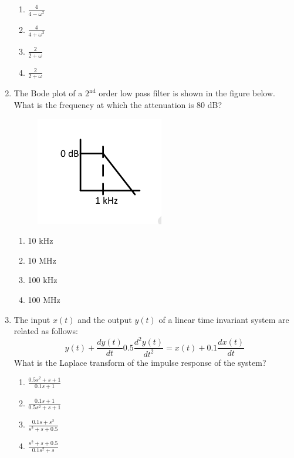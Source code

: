 \documentclass[a4paper,12pt]{exam}
\numberwithin{equation}{enumi}
\numberwithin{figure}{enumi}
\begin{document}
\begin{enumerate}
\hfill{}

\begin{multicols}{4}
\begin{enumerate}
\item $\displaystyle\frac{4}{4 - \omega^2}$
\item$\displaystyle\frac{4}{4 + \omega^2}$
\item $\displaystyle\frac{2}{2 + \omega}$
\item $\displaystyle\frac{2}{2 + \omega}$
\end{enumerate} 
\end{multicols}

\item The Bode plot of a $2^{\text{nd}}$ order low pass filter is shown in the figure below. What is the frequency at which the attenuation is 80 dB?

\begin{figure}[H]
\centering
\includegraphics[width=0.3\columnwidth]{figs/Q23.png}
\label{fig:Q23.png}
\end{figure}

\hfill{}

\begin{enumerate}
\item 10 kHz
\item 10 MHz
\item 100 kHz 
\item 100 MHz
\end{enumerate}  

\item The input $x(t)$ and the output $y(t)$ of a linear time invariant system are related as 
follows: \\[3pt]
\begin{equation*}
y(t) + \frac{dy(t)}{dt} 0.5\frac{d^2y(t)}{dt^2} = x(t) + 0.1\frac{dx(t)}{dt} 
\end{equation*}
What is the Laplace transform of the impulse response of the system? 

\hfill{}

\begin{enumerate}
\item $\displaystyle\frac{0.5s^2 + s + 1}{0.1s + 1}$
\vspace{0.25cm}
\item $\displaystyle\frac{0.1s + 1}{0.5s^2 + s + 1}$
\vspace{0.25cm}
\item $\displaystyle\frac{0.1s + s^2}{s^2 + s + 0.5}$
\vspace{0.25cm}
\item $\displaystyle\frac{s^2 + s + 0.5}{0.1s^2 + s}$
\end{enumerate}  


\end{enumerate}
\end{document}
